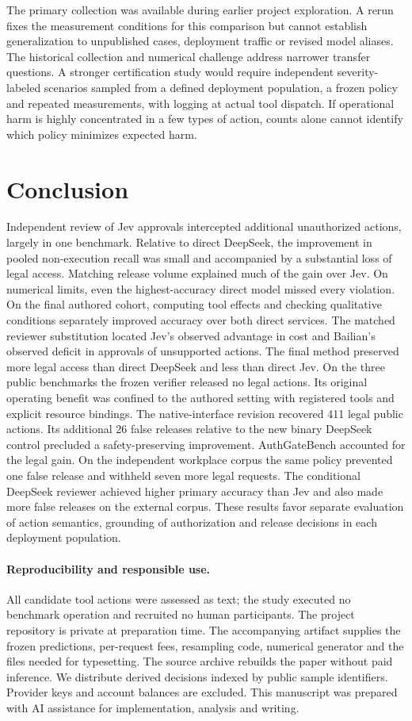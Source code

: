 The primary collection was available during earlier project exploration. A rerun fixes the measurement conditions for this comparison but cannot establish generalization to unpublished cases, deployment traffic or revised model aliases. The historical collection and numerical challenge address narrower transfer questions. A stronger certification study would require independent severity-labeled scenarios sampled from a defined deployment population, a frozen policy and repeated measurements, with logging at actual tool dispatch. If operational harm is highly concentrated in a few types of action, counts alone cannot identify which policy minimizes expected harm.

\section{Conclusion}
Independent review of Jev approvals intercepted additional unauthorized actions, largely in one benchmark. Relative to direct DeepSeek, the improvement in pooled non-execution recall was small and accompanied by a substantial loss of legal access. Matching release volume explained much of the gain over Jev. On numerical limits, even the highest-accuracy direct model missed every violation. On the final authored cohort, computing tool effects and checking qualitative conditions separately improved accuracy over both direct services. The matched reviewer substitution located Jev's observed advantage in cost and Bailian's observed deficit in approvals of unsupported actions. The final method preserved more legal access than direct DeepSeek and less than direct Jev. On the three public benchmarks the frozen verifier released no legal actions. Its original operating benefit was confined to the authored setting with registered tools and explicit resource bindings. The native-interface revision recovered 411 legal public actions. Its additional 26 false releases relative to the new binary DeepSeek control precluded a safety-preserving improvement. AuthGateBench accounted for the legal gain. On the independent workplace corpus the same policy prevented one false release and withheld seven more legal requests. The conditional DeepSeek reviewer achieved higher primary accuracy than Jev and also made more false releases on the external corpus. These results favor separate evaluation of action semantics, grounding of authorization and release decisions in each deployment population.

\paragraph{Reproducibility and responsible use.} All candidate tool actions were assessed as text; the study executed no benchmark operation and recruited no human participants. The project repository is private at preparation time. The accompanying artifact supplies the frozen predictions, per-request fees, resampling code, numerical generator and the files needed for typesetting. The source archive rebuilds the paper without paid inference. We distribute derived decisions indexed by public sample identifiers. Provider keys and account balances are excluded. This manuscript was prepared with AI assistance for implementation, analysis and writing.
